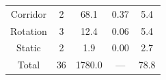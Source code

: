 \documentclass[conference]{IEEEtran}
\begin{document}
\begin{center}
\begin{table}[h]
\begin{tabular}{ccccc}
			\hline

 
			{Corridor} & {2} & {68.1}  & {0.37}& {5.4}\\	


			{Rotation} & {3} & {12.4}  & {0.06}& {5.4}   \\

			{Static} & {2} & {1.9}  & {0.00}& {2.7}  \\

	
			\hline

			{Total} & {36} & {1780.0}  & {---}& {78.8}   \\

			\hline     
			
		\end{tabular}
	\end{table}
		\end{center}
	


	
	
			
			
			
			
			
	


			
			
	
\end{document}
